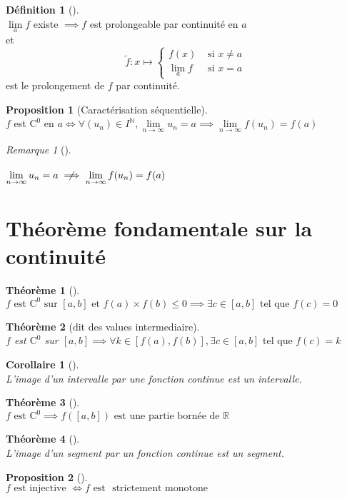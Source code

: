 \documentclass{article}
\newcommand{\R}{\mathbb{R}}
\newcommand{\N}{\mathbb{N}}
\newcommand{\et}{\text{ et }}
\newcommand{\tq}{\text{ tel que }}
\newcommand{\lm}{\lim\limits}
\newcommand{\co}[1]{\mathrm{C^{#1}}}
\newcommand{\lminf}{\lm_{n \to \infty}}
\newcommand{\notimplies}{\centernot\implies}
\newcommand{\est}{\text{ est }}
\newcommand{\strmo}{\text{ strictement monotone }}
\newenvironment{att}
{\bgroup \color{red}{\Large\textbf{Attention}}\\}
{\egroup}
\theoremstyle{definition}
\newtheorem*{prop}{Proposition}
\newtheorem*{defin}{Définition}
\theoremstyle{remark}
\newtheorem*{rema}{Remarque}
\theoremstyle{plain}
\newtheorem*{them}{Théorème}
\newtheorem*{coro}{Corollaire}
\newenvironment{prp}[1][]
{\begin{prop}[#1]\quad\\}
{\end{prop}}
\newenvironment{dfn}[1][]
{\begin{defin}[#1]\quad\\}
{\end{defin}}
\newenvironment{rem}[1][]
{\begin{rema}[#1]\quad\\}
{\end{rema}}
\newenvironment{thm}[1][]
{\begin{them}[#1]\quad\\}
{\end{them}}
\newenvironment{cor}[1][]
{\begin{coro}[#1]\quad\\}
{\end{coro}}
\begin{document}
\begin{dfn}
$\lm_a f$ existe $\implies f$ est prolongeable par continuité en $a$ \\
et 
\[
\tilde{f} : x \mapsto
\begin{cases}
f(x)    &\text{ si } x \neq a \\
\lm_a f &\text{ si } x = a
\end{cases}
\]
est le prolongement de $f$ par continuité.
\end{dfn}

\begin{prp}[Caractérisation séquentielle]
$f$ est $\co{0}$ en $a \iff \forall (u_n) \in I^\N,
\lm_{n \to \infty} u_n = a \implies \lm_{n \to \infty} f(u_n) = f(a)$
\end{prp}

\begin{rem}
\begin{att}
$\lminf u_n = a \notimplies \lminf f(u_n) = f(a)$
\end{att}
\end{rem}

\section{Théorème fondamentale sur la continuité}

\begin{thm}
$f \est \co{0} \text{ sur } {[a, b]} \et f(a) \times f(b) \leq 0
\implies \exists c \in {[a, b]} \tq f(c) = 0$
\end{thm}

\begin{thm}[dit des values intermediaire]
$f$ est $\co{0}$ sur ${[a, b]} \implies 
\forall k \in {[f(a), f(b)]}, \exists c \in [a, b] \tq f(c) = k$
\end{thm}

\begin{cor}
L'image d'un intervalle par une fonction continue est un intervalle.
\end{cor}

\begin{thm}
$f \est \co{0} \implies f({[a, b]}) \text{ est une partie bornée de } \R$
\end{thm}

\begin{thm}
L'image d'un segment par un fonction continue est un segment.
\end{thm}

\begin{prp}
$f \text{ est injective } \iff f \est \! \strmo$
\end{prp}
\end{document}
